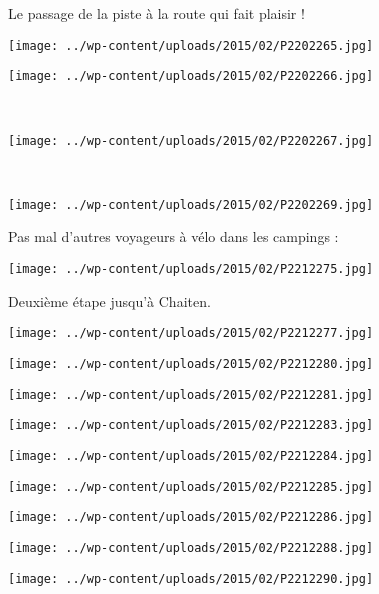 \pagebreak
Le passage de la piste à la route qui fait plaisir !
\begin{center} \texttt{[image: ../wp-content/uploads/2015/02/P2202265.jpg]} \end{center}
\begin{center} \texttt{[image: ../wp-content/uploads/2015/02/P2202266.jpg]} \end{center}
\vspace{-\topsep}
\vspace{-3.25mm}

\pagebreak
~
\begin{center} \texttt{[image: ../wp-content/uploads/2015/02/P2202267.jpg]} \end{center}
~
\begin{center} \texttt{[image: ../wp-content/uploads/2015/02/P2202269.jpg]} \end{center}
\vspace{-\topsep}

\pagebreak
Pas mal d'autres voyageurs à vélo dans les campings :
\begin{center} \texttt{[image: ../wp-content/uploads/2015/02/P2212275.jpg]} \end{center}

Deuxième étape jusqu'à Chaiten.
\begin{center} \texttt{[image: ../wp-content/uploads/2015/02/P2212277.jpg]} \end{center}
\begin{center} \texttt{[image: ../wp-content/uploads/2015/02/P2212280.jpg]} \end{center}
\begin{center} \texttt{[image: ../wp-content/uploads/2015/02/P2212281.jpg]} \end{center}
\begin{center} \texttt{[image: ../wp-content/uploads/2015/02/P2212283.jpg]} \end{center}
\begin{center} \texttt{[image: ../wp-content/uploads/2015/02/P2212284.jpg]} \end{center}
\begin{center} \texttt{[image: ../wp-content/uploads/2015/02/P2212285.jpg]} \end{center}
\begin{center} \texttt{[image: ../wp-content/uploads/2015/02/P2212286.jpg]} \end{center}
\begin{center} \texttt{[image: ../wp-content/uploads/2015/02/P2212288.jpg]} \end{center}
\vfill
\begin{center} \texttt{[image: ../wp-content/uploads/2015/02/P2212290.jpg]} \end{center}
\vspace{-\topsep}
\vspace{-0.75mm}


